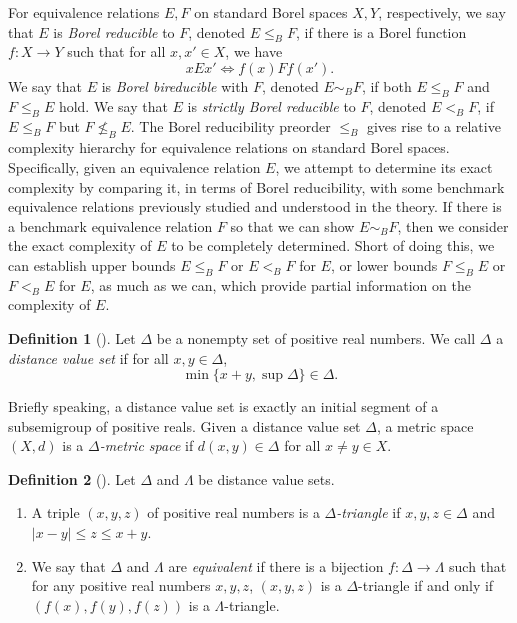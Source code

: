 \documentclass[10pt,a4paper]{amsart}
\theoremstyle{definition}
\newtheorem{definition}{Definition}[section]
\theoremstyle{remark}
\begin{document}
For equivalence relations $E, F$ on standard Borel spaces $X, Y$, respectively, we say that $E$ is {\em Borel reducible} to $F$, denoted $E\leq_B F$, if there is a Borel function $f\colon X\to Y$ such that for all $x, x'\in X$, we have
$$ xEx'\iff f(x)Ff(x'). $$
We say that $E$ is {\em Borel bireducible} with $F$, denoted $E\sim_B F$, if both $E\leq_B F$ and $F\leq_B E$ hold. We say that $E$ is {\em strictly Borel reducible} to $F$, denoted $E<_B F$, if $E\leq_B F$ but $F\not\leq_B E$. The Borel reducibility preorder $\leq_B$ gives rise to a relative complexity hierarchy for equivalence relations on standard Borel spaces. Specifically, given an equivalence relation $E$, we attempt to determine its exact complexity by comparing it, in terms of Borel reducibility, with some benchmark equivalence relations previously studied  and understood in the theory. If there is a benchmark equivalence relation $F$ so that we can show $E\sim_B F$, then we consider the exact complexity of $E$ to be completely determined. Short of doing this, we can establish upper bounds $E\leq_B F$ or $E<_B F$ for $E$, or lower bounds $F\leq_B E$ or $F<_B E$ for $E$, as much as we can, which provide partial information on the complexity of $E$.

    \begin{definition}[\cite{EGLMM}]
        Let $\Delta$ be a nonempty set of positive real numbers. We call $\Delta$ a {\em distance value set} if for all $x, y\in \Delta$, 
        \begin{equation*}
           \min\{ x+y, \sup\Delta\} \in \Delta.
        \end{equation*}
    \end{definition}
Briefly speaking, a distance value set is exactly an initial segment of a subsemigroup of positive reals. Given a distance value set $\Delta$, a metric space $(X,d)$ is a {\em $\Delta$-metric space} if $d(x,y)\in\Delta$ for all $x\neq y\in X$. 

\begin{definition}[\cite{EGLMM}]\label{def:CDVSequiv} Let $\Delta$ and $\Lambda$ be distance value sets. 
\begin{enumerate}
\item[(i)] A triple $(x,y,z)$ of positive real numbers is a {\em $\Delta$-triangle} if $x,y, z\in \Delta$ and $|x-y|\leq z\leq x+y$.
\item[(ii)] We say that $\Delta$ and $\Lambda$ are {\em equivalent} if there is a bijection $f\colon \Delta\to \Lambda$ such that for any positive real numbers $x,y, z$, $(x,y,z)$ is a $\Delta$-triangle if and only if $(f(x), f(y), f(z))$ is a $\Lambda$-triangle.
\end{enumerate}
\end{definition}
\end{document}
